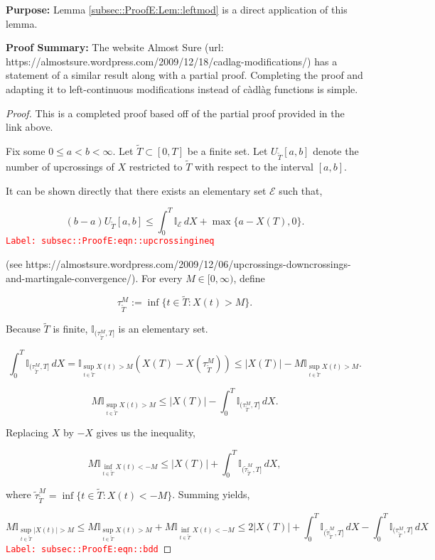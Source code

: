 \documentclass[12pt]{article}
\newcommand{\mb}{\mathbb}
\newcommand{\mc}{\mathcal}
\newcommand{\tr}{\textcolor{red}}
\newcommand{\labe}[1]{\tr{\texttt{Label: #1}}}
\newcommand{\purpose}{\textbf{Purpose: }}
\newcommand{\pfsum}{\textbf{Proof Summary: }}
\newcommand{\ind}{\hspace{24pt}}
\newcommand{\T}{T}								%
\renewcommand{\t}{t}							%
\newcommand{\X}{X}								%
\newcommand{\tp}[1]{(#1)}						%
\newcommand{\alt}[1]{\widetilde{#1}}			%
\newcommand{\rt}{\tau}							%
\newcommand{\evnt}{\mc{E}}						%
\newcommand{\Tset}{\alt{T}}						%
\newcommand{\upcrs}{U}							%
\newcommand{\gid}[1]{^{#1}}						%
\newcommand{\gidd}[1]{_{#1}}					%
\begin{document}
\purpose Lemma \ref{subsec::ProofE:Lem::leftmod} is a direct application of this lemma.

\pfsum The website Almost Sure (url: https://almostsure.wordpress.com/2009/12/18/cadlag-modifications/) has a statement of a similar result along with a partial proof. Completing the proof and adapting it to left-continuous modifications instead of c\`adl\`ag functions is simple.

\begin{proof}
This is a completed proof based off of the partial proof provided in the link above.

\ind Fix some \(0\leq a < b < \infty\). Let \(\Tset \subset [0,\T]\) be a finite set. Let \(\upcrs\gidd{\alt{\T}}[a,b]\) denote the number of upcrossings of \(\X\) restricted to \(\alt{\T}\) with respect to the interval \([a,b]\).

\ind It can be shown directly that there exists an elementary set \(\evnt\) such that,

\begin{equation}
(b-a)\upcrs\gidd{\Tset}[a,b] \leq \int_0^\T \mb{I}_{\evnt}\,d\X + \max\{a - \X\tp{\T},0\}.
\label{subsec::ProofE:eqn::upcrossingineq}
\end{equation}
\labe{subsec::ProofE:eqn::upcrossingineq}

(see https://almostsure.wordpress.com/2009/12/06/upcrossings-downcrossings-and-martingale-convergence/). For every \(M \in [0,\infty)\), define

\[\rt\gid{M}\gidd{\Tset} := \inf\{\t\in \alt{\T}: \X\tp{\t} > M\}.\]

Because \(\Tset\) is finite, \(\mb{I}_{(\rt\gid{M}\gidd{\Tset},\T]}\) is an elementary set.

\[\int_0^\T \mb{I}_{(\rt\gid{M}\gidd{\Tset},\T]}\,d\X = \mb{I}_{\sup_{\t\in \Tset} \X\tp{\t} > M}(\X\tp{\T} - \X\tp{\rt\gid{M}\gidd{\Tset}}) \leq |\X\tp{\T}| - M\mb{I}_{\sup_{\t \in \Tset} \X\tp{\t} > M}.\]

\[M\mb{I}_{\sup_{\t\in\Tset} \X\tp{\t} > M} \leq |\X\tp{\T}| - \int_0^T \mb{I}_{(\rt\gid{M}\gidd{\Tset},\T]}\,d\X.\]


Replacing \(\X\) by \(-\X\) gives us the inequality,

\[M\mb{I}_{\inf_{\t\in\Tset} \X\tp{\t} < -M} \leq |\X\tp{\T}| + \int_0^T \mb{I}_{(\alt{\rt}\gid{M}\gidd{\Tset},\T]}\,d\X,\]

where \(\alt{\rt}\gid{M}\gidd{\Tset} = \inf\{\t\in \Tset: \X\tp{\t} < -M\}\). Summing yields,

\begin{equation}
M\mb{I}_{\sup_{\t\in\Tset}|\X\tp{\t}| > M} \leq M\mb{I}_{\sup_{\t\in\Tset}\X\tp{\t} > M} + M\mb{I}_{\inf_{\t\in\Tset}\X\tp{\t} < -M} \leq 2|\X\tp{\T}| + \int_0^\T \mb{I}_{(\alt{\rt}\gid{M}\gidd{\Tset},\T]}\,d\X - \int_0^\T \mb{I}_{(\rt\gid{M}\gidd{\Tset},\T]}\,d\X
\label{subsec::ProofE:eqn::bdd}
\end{equation}
\labe{subsec::ProofE:eqn::bdd}


\end{proof}
\end{document}
